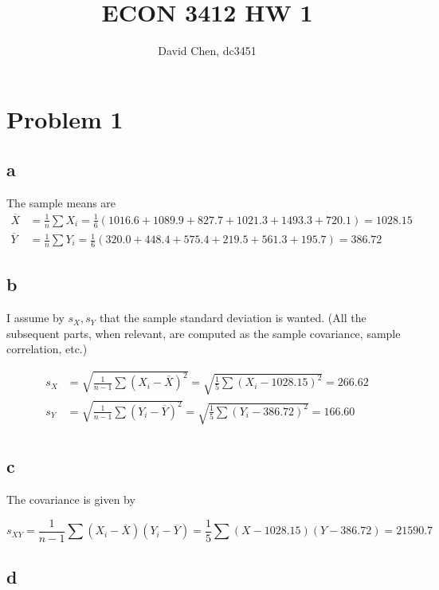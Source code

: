 \documentclass[12pt,letterpaper]{article}
\title{ECON 3412 HW 1}
\author{David Chen, dc3451}
\theoremstyle{definition}
\begin{document}
\maketitle

\section*{Problem 1}

\subsection*{a}

The sample means are
\begin{align*}
  \overline{X} &= \frac{1}{n}\sum X_{i} = \frac{1}{6}(1016.6+1089.9 +827.7+1021.3+1493.3 +720.1) = 1028.15 \\
  \overline{Y} &= \frac{1}{n}\sum Y_{i} = \frac{1}{6}(320.0+448.4+575.4+219.5+561.3+195.7) = 386.72
\end{align*}

\subsection*{b}

I assume by $s_{X}, s_{Y}$ that the sample standard deviation is wanted. (All the subsequent parts, when relevant, are computed as the sample covariance, sample correlation, etc.)

\begin{align*}
  s_{X} &= \sqrt{\frac{1}{n-1}\sum (X_{i} - \overline{X})^{2}} = \sqrt{\frac{1}{5}\sum(X_{i} - 1028.15)^{2}} = 266.62 \\
  s_{Y} &= \sqrt{\frac{1}{n-1}\sum (Y_{i} - \overline{Y})^{2}} = \sqrt{\frac{1}{5}\sum(Y_{i} - 386.72)^{2}} = 166.60 \\
\end{align*}

\subsection*{c}

The covariance is given by

\[
  s_{XY} = \frac{1}{n-1}\sum(X_{i} - \overline{X})(Y_{i} - \overline{Y}) = \frac{1}{5}\sum (X - 1028.15)(Y - 386.72) = 21590.7
\]

\subsection*{d}
\end{document}
